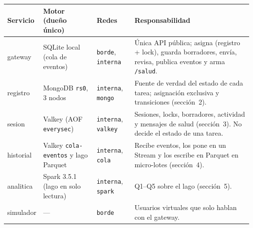 \documentclass[10pt,letterpaper]{article}
\begin{document}
\begin{center}\footnotesize
\begin{tabular}{@{}>{\raggedright}p{}>{\raggedright}p{}>{\raggedright}p{}>{\raggedright\arraybackslash}p{}@{}}
\toprule
Servicio & Motor (dueño único) & Redes & Responsabilidad \\
\midrule
gateway & SQLite local (cola de eventos) & \texttt{borde}, \texttt{interna} & Única API pública; asigna (registro + lock), guarda borradores, envía, revisa, publica eventos y arma \texttt{/salud}. \\
registro & MongoDB \texttt{rs0}, 3 nodos & \texttt{interna}, \texttt{mongo} & Fuente de verdad del estado de cada tarea; asignación exclusiva y transiciones (sección~2). \\
sesion & Valkey (AOF \texttt{everysec}) & \texttt{interna}, \texttt{valkey} & Sesiones, locks, borradores, actividad y mensajes de salud (sección~3). No decide el estado de una tarea. \\
historial & Valkey \texttt{cola-eventos} y lago Parquet & \texttt{interna}, \texttt{cola} & Recibe eventos, los pone en un Stream y los escribe en Parquet en micro-lotes (sección~4). \\
analitica & Spark 3.5.1 (lago en solo lectura) & \texttt{interna}, \texttt{spark} & Q1--Q5 sobre el lago (sección~5). \\
simulador & --- & \texttt{borde} & Usuarios virtuales que solo hablan con el gateway. \\
\bottomrule
\end{tabular}
\end{center}
\end{document}
